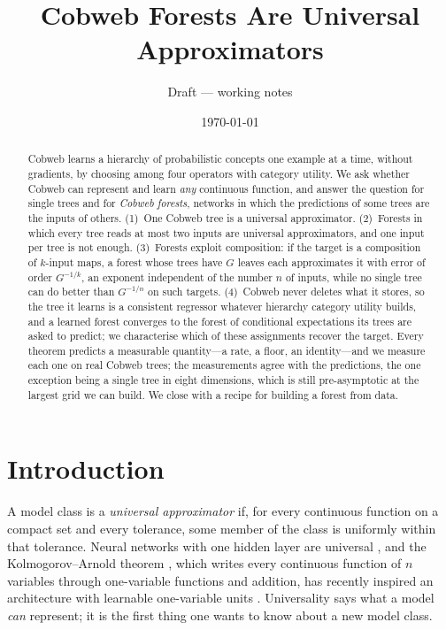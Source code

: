 \title{Cobweb Forests Are Universal Approximators}
\author{Draft --- working notes}
\date{\today}


\maketitle

\begin{abstract}
Cobweb learns a hierarchy of probabilistic concepts one example at a time, without
gradients, by choosing among four operators with category utility.  We ask whether
Cobweb can represent and learn \emph{any} continuous function, and answer the question
for single trees and for \emph{Cobweb forests}, networks in which the predictions of some
trees are the inputs of others.  (1)~One Cobweb tree is a universal approximator.
(2)~Forests in which every tree reads at most two inputs are universal approximators, and
one input per tree is not enough.  (3)~Forests exploit composition: if the target is a
composition of $k$-input maps, a forest whose trees have $G$ leaves each approximates it
with error of order $G^{-1/k}$, an exponent independent of the number $n$ of inputs,
while no single tree can do better than $G^{-1/n}$ on such targets.  (4)~Cobweb never deletes what it stores, so the tree it learns is a
consistent regressor whatever hierarchy category utility builds, and a learned forest
converges to the forest of conditional expectations its trees are asked to predict; we
characterise which of these assignments recover the target.  Every theorem predicts a
measurable quantity---a rate, a floor, an identity---and we measure each one on real
Cobweb trees; the measurements agree with the predictions, the one exception being a
single tree in eight dimensions, which is still pre-asymptotic at the largest grid we can
build.  We close with a recipe for
building a forest from data.
\end{abstract}

\tableofcontents

\section{Introduction}\label{sec:intro}

A model class is a \emph{universal approximator} if, for every continuous function on a
compact set and every tolerance, some member of the class is uniformly within that
tolerance.  Neural networks with one hidden layer are universal \citep{cybenko1989,hornik1989},
and the Kolmogorov--Arnold theorem \citep{kolmogorov1957,arnold1957}, which writes every
continuous function of $n$ variables through one-variable functions and addition, has
recently inspired an architecture with learnable one-variable units
\citep{liu2024kan}.  Universality says what a model \emph{can} represent; it is the first
thing one wants to know about a new model class.


